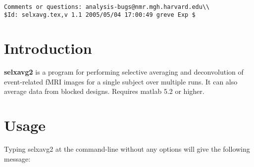\documentclass[10pt]{article}
\begin{document}
\begin{Large}
 \\
\end{Large}

\noindent 
\begin{verbatim}
Comments or questions: analysis-bugs@nmr.mgh.harvard.edu\\
$Id: selxavg.tex,v 1.1 2005/05/04 17:00:49 greve Exp $
\end{verbatim}

\section{Introduction}
{\bf selxavg2} is a program for performing selective averaging and
deconvolution of event-related fMRI images for a single subject over
multiple runs. It can also average data from blocked designs. Requires
matlab 5.2 or higher.\\

\section{Usage}
Typing selxavg2 at the command-line without any options will give the
following message:\\ 
\end{document}
